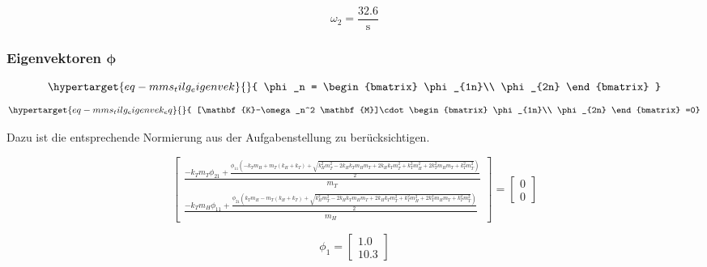 \documentclass[
  letterpaper,
  DIV=11]{scrreprt}
\begin{document}
\begin{equation}\omega_{2} = \frac{32.6}{\text{s}}\end{equation}

\hypertarget{eigenvektoren-mathbfphi}{%
\subsubsection{\texorpdfstring{Eigenvektoren
\(\mathbf{\phi}\)}{Eigenvektoren \textbackslash mathbf\{\textbackslash phi\}}}\label{eigenvektoren-mathbfphi}}

\begin{equation}\protect\hypertarget{eq-mms_tilg_eigenvek}{}{
\phi_n = \begin{bmatrix}
\phi_{1n}\\
\phi_{2n} 
\end{bmatrix}
}\label{eq-mms_tilg_eigenvek}\end{equation}
\begin{equation}\protect\hypertarget{eq-mms_tilg_eigenvek_eq}{}{
[\mathbf{K}-\omega_n^2 \mathbf{M}]\cdot \begin{bmatrix}
\phi_{1n}\\
\phi_{2n} 
\end{bmatrix}
=0}\label{eq-mms_tilg_eigenvek_eq}\end{equation}

Dazu ist die entsprechende Normierung aus der Aufgabenstellung zu
berücksichtigen.

\begin{equation}\left[\begin{matrix}\frac{- k_{T} m_{T} \phi_{21} + \frac{\phi_{11} \left(- k_{T} m_{H} + m_{T} \left(k_{H} + k_{T}\right) + \sqrt{k_{H}^{2} m_{T}^{2} - 2 k_{H} k_{T} m_{H} m_{T} + 2 k_{H} k_{T} m_{T}^{2} + k_{T}^{2} m_{H}^{2} + 2 k_{T}^{2} m_{H} m_{T} + k_{T}^{2} m_{T}^{2}}\right)}{2}}{m_{T}}\\\frac{- k_{T} m_{H} \phi_{11} + \frac{\phi_{21} \left(k_{T} m_{H} - m_{T} \left(k_{H} + k_{T}\right) + \sqrt{k_{H}^{2} m_{T}^{2} - 2 k_{H} k_{T} m_{H} m_{T} + 2 k_{H} k_{T} m_{T}^{2} + k_{T}^{2} m_{H}^{2} + 2 k_{T}^{2} m_{H} m_{T} + k_{T}^{2} m_{T}^{2}}\right)}{2}}{m_{H}}\end{matrix}\right] = \left[\begin{matrix}0\\0\end{matrix}\right]\end{equation}

\begin{equation}\phi_{1} = \left[\begin{matrix}1.0\\10.3\end{matrix}\right]\end{equation}
\end{document}

